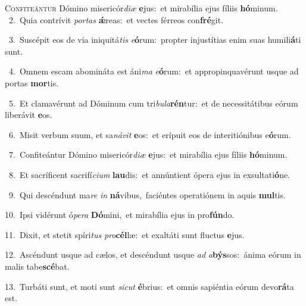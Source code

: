 \lettrine{\initial\textcolor{\initialcolor}{C}}{onfiteántur} Dómino misericór\-\textit{di}\-\textit{æ} \textbf{e}\-jus:~\star et mirabília ejus fíliis \textbf{hó}\-minum.\\
{\numbfont\textcolor{\numbcolor}{~2.}}~Quia contrívit \textit{por}\-\textit{tas} \textbf{ǽ}\-reas:~\star et vectes férreos con\-\textbf{fré}\-git.\par
{\numbfont\textcolor{\numbcolor}{~3.}}~Suscépit eos de via iniquitá\textit{tis} \textit{e}\-\textbf{ó}rum:~\star propter injustítias enim suas humili\-\textbf{á}\-ti sunt.\par
{\numbfont\textcolor{\numbcolor}{~4.}}~Omnem escam abomináta est áni\textit{ma} \textit{e}\-\textbf{ó}rum:~\star et appropinquavérunt usque ad portas \textbf{mor}\-tis.\par
{\numbfont\textcolor{\numbcolor}{~5.}}~Et clamavérunt ad Dóminum cum tri\-\textit{bu}\-\textit{la}\textbf{rén}tur:~\star et de necessitátibus eórum liberávit \textbf{e}\-os.\par
{\numbfont\textcolor{\numbcolor}{~6.}}~Misit verbum suum, et sa\-\textit{ná}\-\textit{vit} \textbf{e}\-os:~\star et erípuit eos de interitiónibus e\-\textbf{ó}\-rum.\par
{\numbfont\textcolor{\numbcolor}{~7.}}~Confiteántur Dómino misericór\-\textit{di}\-\textit{æ} \textbf{e}\-jus:~\star et mirabília ejus fíliis \textbf{hó}\-minum.\par
{\numbfont\textcolor{\numbcolor}{~8.}}~Et sacríficent sacrifí\-\textit{ci}\-\textit{um} \textbf{lau}\-dis:~\star et annúntient ópera ejus in exsultati\-\textbf{ó}\-ne.\par
{\numbfont\textcolor{\numbcolor}{~9.}}~Qui descéndunt ma\textit{re} \textit{in} \textbf{ná}\-vibus,~\star faciéntes operatiónem in aquis \textbf{mul}\-tis.\par
{\numbfont\textcolor{\numbcolor}{10.}}~Ipsi vidérunt ó\-\textit{pe}\-\textit{ra} \textbf{Dó}\-mini,~\star et mirabília ejus in pro\-\textbf{fún}\-do.\par
{\numbfont\textcolor{\numbcolor}{11.}}~Dixit, et stetit spíri\textit{tus} \textit{pro}\-\textbf{cél}læ:~\star et exaltáti sunt fluctus \textbf{e}\-jus.\par
{\numbfont\textcolor{\numbcolor}{12.}}~Ascéndunt usque ad cælos, et descéndunt usque \textit{ad} \textit{a}\-\textbf{býs}sos:~\star ánima eórum in malis tabe\-\textbf{scé}\-bat.\par
{\numbfont\textcolor{\numbcolor}{13.}}~Turbáti sunt, et moti sunt \textit{sic}\-\textit{ut} \textbf{é}\-brius:~\star et omnis sapiéntia eórum devo\-\textbf{rá}\-ta est.\par
